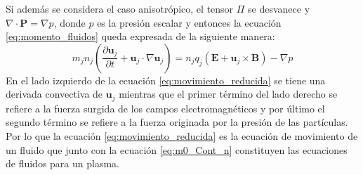 \documentclass[../tesis_main_file.tex]{subfiles}
\begin{document}
Si además se considera el caso anisotrópico, el tensor $\Pi$ se desvanece y $\nabla \cdot \textbf{P}=\nabla p$, donde $p$ es la presión escalar y entonces la ecuación \ref{eq:momento_fluidos} queda expresada de la siguiente manera:
\begin{equation}
\label{eq:movimiento_reducida}
m_jn_j \left( \frac{\partial \textbf{u}_j}{\partial t}+\textbf{u}_j\cdot \nabla \textbf{u}_j \right)= n_jq_j(\textbf{E}+\textbf{u}_j\times \textbf{B})- \nabla p
\end{equation}
En el lado izquierdo de la ecuación \ref{eq:movimiento_reducida} se tiene una derivada convectiva de $\textbf{u}_j$ mientras que el primer término del lado derecho se refiere a la fuerza surgida de los campos electromagnéticos y por último el segundo término se refiere a la fuerza originada por la presión de las partículas.
Por lo que la ecuación \ref{eq:movimiento_reducida} es la ecuación de movimiento de un fluido que junto con la ecuación \ref{eq:m0_Cont_n} constituyen las ecuaciones de fluidos para un plasma.
\end{document}
